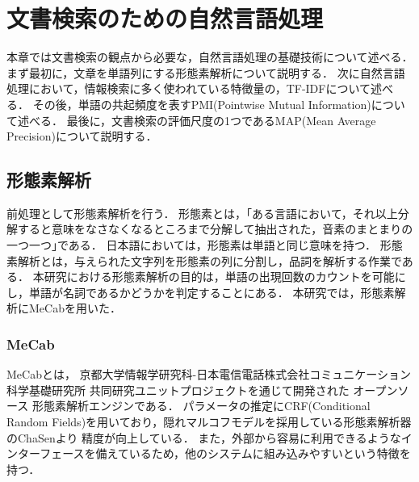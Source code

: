 \chapter{文書検索のための自然言語処理}
本章では文書検索の観点から必要な，自然言語処理の基礎技術について述べる．
まず最初に，文章を単語列にする形態素解析について説明する．
次に自然言語処理において，情報検索に多く使われている特徴量の，TF-IDFについて述べる．
その後，単語の共起頻度を表すPMI(Pointwise Mutual Information)について述べる．
最後に，文書検索の評価尺度の1つであるMAP(Mean Average Precision)について説明する．

\section{形態素解析}
前処理として形態素解析を行う．
形態素とは，｢ある言語において，それ以上分解すると意味をなさなくなるところまで分解して抽出された，音素のまとまりの一つ一つ｣である．
日本語においては，形態素は単語と同じ意味を持つ．
形態素解析とは，与えられた文字列を形態素の列に分割し，品詞を解析する作業である．
本研究における形態素解析の目的は，単語の出現回数のカウントを可能にし，単語が名詞であるかどうかを判定することにある．
本研究では，形態素解析にMeCab\cite{MeCab}を用いた．

\subsection{MeCab}
MeCabとは， 京都大学情報学研究科-日本電信電話株式会社コミュニケーション科学基礎研究所 共同研究ユニットプロジェクトを通じて開発された
オープンソース 形態素解析エンジンである．
パラメータの推定にCRF(Conditional Random Fields)を用いており，隠れマルコフモデルを採用している形態素解析器のChaSen\cite{ChaSen}より
精度が向上している．
また，外部から容易に利用できるようなインターフェースを備えているため，他のシステムに組み込みやすいという特徴を持つ．


